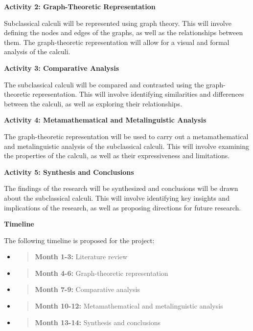 \textbf{Activity 2: Graph-Theoretic Representation}

Subclassical calculi will be represented using graph theory. This will
involve defining the nodes and edges of the graphs, as well as the
relationships between them. The graph-theoretic representation will
allow for a visual and formal analysis of the calculi.

\textbf{Activity 3: Comparative Analysis}

The subclassical calculi will be compared and contrasted using the
graph-theoretic representation. This will involve identifying
similarities and differences between the calculi, as well as exploring
their relationships.

\textbf{Activity 4: Metamathematical and Metalinguistic Analysis}

The graph-theoretic representation will be used to carry out a
metamathematical and metalinguistic analysis of the subclassical
calculi. This will involve examining the properties of the calculi, as
well as their expressiveness and limitations.

\textbf{Activity 5: Synthesis and Conclusions}

The findings of the research will be synthesized and conclusions will be
drawn about the subclassical calculi. This will involve identifying key
insights and implications of the research, as well as proposing
directions for future research.

\textbf{Timeline}

The following timeline is proposed for the project:

\begin{itemize}
\item
  \begin{quote}
  \textbf{Month 1-3:} Literature review
  \end{quote}
\item
  \begin{quote}
  \textbf{Month 4-6:} Graph-theoretic representation
  \end{quote}
\item
  \begin{quote}
  \textbf{Month 7-9:} Comparative analysis
  \end{quote}
\item
  \begin{quote}
  \textbf{Month 10-12:} Metamathematical and metalinguistic analysis
  \end{quote}
\item
  \begin{quote}
  \textbf{Month 13-14:} Synthesis and conclusions
  \end{quote}
\end{itemize}


